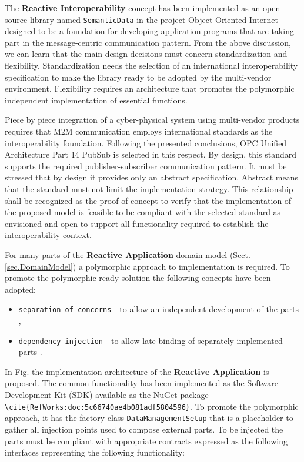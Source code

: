 \documentclass[
]{article}
\providecommand{\tightlist}{%
  \setlength{\itemsep}{0pt}\setlength{\parskip}{0pt}}
\begin{document}
The \textbf{Reactive Interoperability} concept has been implemented as
an open-source library named \texttt{SemanticData} in the project
Object-Oriented Internet \cite{RefWorks:doc:5c66740ae4b081adf5804596}
designed to be a foundation for developing application programs that are
taking part in the message-centric communication pattern. From the above
discussion, we can learn that the main design decisions must concern
standardization and flexibility. Standardization needs the selection of
an international interoperability specification to make the library
ready to be adopted by the multi-vendor environment. Flexibility
requires an architecture that promotes the polymorphic independent
implementation of essential functions.

Piece by piece integration of a cyber-physical system using multi-vendor
products requires that M2M communication employs international standards
as the interoperability foundation. Following the presented conclusions,
OPC Unified Architecture Part 14 PubSub
\cite{RefWorks:doc:5d98837de4b055984c0eecf0} is selected in this
respect. By design, this standard supports the required
publisher-subscriber communication pattern. It must be stressed that by
design it provides only an abstract specification. Abstract means that
the standard must not limit the implementation strategy. This
relationship shall be recognized as the proof of concept to verify that
the implementation of the proposed model is feasible to be compliant
with the selected standard as envisioned and open to support all
functionality required to establish the interoperability context.

For many parts of the \textbf{Reactive Application} domain model (Sect.
\ref*{sec.DomainModel}) a polymorphic approach to implementation is
required. To promote the polymorphic ready solution the following
concepts have been adopted:

\begin{itemize}
\tightlist
\item
  \texttt{separation\ of\ concerns} - to allow an independent
  development of the parts \cite{RefWorks:doc:5d92609be4b02eb43d372bd1},
\item
  \texttt{dependency\ injection} - to allow late binding of separately
  implemented parts \cite{RefWorks:doc:5d925b77e4b030b4e0596f5d}.
\end{itemize}

In Fig. the implementation architecture of the \textbf{Reactive
Application} is proposed. The common functionality has been implemented
as the Software Development Kit (SDK) available as the NuGet package
\texttt{\textbackslash{}cite\{RefWorks:doc:5c66740ae4b081adf5804596\}}.
To promote the polymorphic approach, it has the factory class
\texttt{DataManagementSetup} that is a placeholder to gather all
injection points used to compose external parts. To be injected the
parts must be compliant with appropriate contracts expressed as the
following interfaces representing the following functionality:
\end{document}

